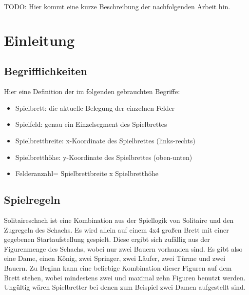\documentclass[
	12pt,
	a4paper,
	BCOR10mm,
	DIV14,
	listof=totoc,
	bibliography=totoc,
	headsepline
]{scrreprt}
\begin{document}
TODO: Hier kommt eine kurze Beschreibung der nachfolgenden Arbeit hin.

\tableofcontents

\chapter{Einleitung}
\label{Einleitung}


\section{Begrifflichkeiten}
Hier eine Definition der im folgenden gebrauchten Begriffe:
\begin{itemize}
	\item Spielbrett: die aktuelle Belegung der einzelnen Felder
	\item Spielfeld: genau ein Einzelsegment des Spielbrettes
	\item Spielbrettbreite: x-Koordinate des Spielbrettes (links-rechts)
	\item Spielbretthöhe: y-Koordinate des Spielbrettes (oben-unten)
	\item Felderanzahl= Spielbrettbreite x Spielbretthöhe
\end{itemize}


\section{Spielregeln}
Solitaireschach ist eine Kombination aus der Spiellogik von Solitaire und 
den Zugregeln des Schachs. Es wird allein auf einem 4x4 großen Brett mit einer gegebenen Startaufstellung gespielt. Diese ergibt sich zufällig aus der Figurenmenge des Schachs, wobei nur zwei Bauern vorhanden sind. Es gibt also eine Dame,
einen König, zwei Springer, zwei Läufer, zwei Türme und zwei Bauern. 
Zu Beginn kann eine beliebige Kombination dieser Figuren auf dem Brett stehen, wobei mindestens zwei und maximal zehn Figuren benutzt werden.
Ungültig wären Spielbretter bei denen zum Beispiel zwei Damen aufgestellt sind.
\end{document}
